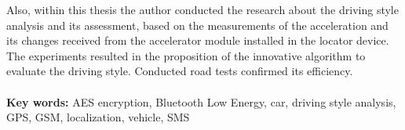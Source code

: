 \begin{singlespacing}
Also, within this thesis the author conducted the research about the driving style analysis and its assessment, based on the measurements of the acceleration and its changes received from the accelerator module installed in the locator device. The experiments resulted in the proposition of the innovative algorithm to evaluate the driving style. Conducted road tests confirmed its efficiency. \\

\flushbottom
\textbf{\\Key words: }AES encryption, Bluetooth Low Energy, car, driving style analysis, GPS, GSM, localization, vehicle, SMS
\end{singlespacing}
